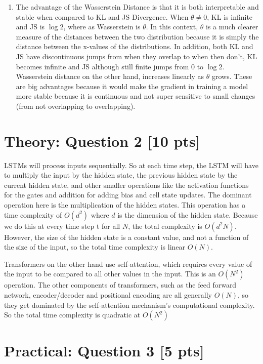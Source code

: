 \documentclass{article}
\begin{document}
\begin{enumerate}[label=\alph*)]
\begin{itemize}
    \end{itemize}  
    \item The advantage of the Wasserstein Distance is that it is both interpretable and stable when compared to KL and JS Divergence. When $\theta \neq 0$,
    KL is infinite and JS is $\log2$, where as Wasserstein is $\theta$. In this context, $\theta$ is a much clearer measure of the distances between the two 
    distribution because it is simply the distance between the x-values of the distributions. In addition, both KL and JS have discontinuous jumps from when 
    they overlap to when then don't, KL becomes infinite and JS although still finite jumps from 0 to $\log2$. Wasserstein distance on the other hand, increases linearly as 
    $\theta$ grows. These are big advantages because it would make the gradient in training a model more stable because it is continuous and not super sensitive to small changes (from not overlapping to overlapping).

\end{enumerate}


\section{Theory: Question 2 [10 pts]}

LSTMs will process inputs sequentially. So at each time step, the LSTM will have to multiply the input by the hidden state, the previous hidden state by the current hidden state,
and other smaller operations like the activation functions for the gates and addition for adding bias and cell state updates. The dominant operation here is the multiplication of the 
hidden states. This operation has a time complexity of $O(d^2)$ where $d$ is the dimension of the hidden state. Because we do this at every time step t for all $N$, the total complexity is $O(d^2N)$.
However, the size of the hidden state is a constant value, and not a function of the size of the input, so the total time complexity is linear $O(N)$.

Transformers on the other hand use self-attention, which requires every value of the input to be compared to all other values in the input. This is an $O(N^2)$ operation. The other components
of transformers, such as the feed forward network, encoder/decoder and positional encoding are all generally $O(N)$, so they get dominated by the self-attention mechanism's computational complexity.
So the total time complexity is quadratic at $O(N^2)$

\section{Practical: Question 3 [5 pts]}
\end{document}
